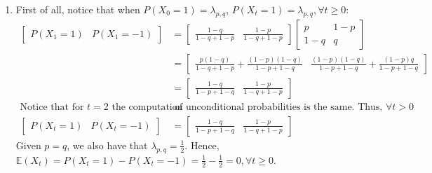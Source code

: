 \documentclass[]{article}
\begin{document}
\begin{enumerate}[label=\alph*)]
	\item First of all, notice that when $P(X_0=1)=\lambda_{p,q}$, $P(X_t=1)=\lambda_{p,q}, \forall t\geq0$:
	\begin{equation}
	\begin{split}
		\begin{bmatrix}
		P(X_1=1) & P(X_1=-1)
		\end{bmatrix}&=\begin{bmatrix}
		\frac{1-q}{1-q+1-p} & \frac{1-p}{1-q+1-p}
		\end{bmatrix}\begin{bmatrix}
		p & 1-p \\ 1-q & q
		\end{bmatrix}\\
		& = \begin{bmatrix}
		\frac{p(1-q)}{1-q+1-p}+\frac{(1-p)(1-q)}{1-p+1-q} & \frac{(1-p)(1-q)}{1-p+1-q}+\frac{(1-p)q}{1-p+1-q}
		\end{bmatrix}\\
		& = \begin{bmatrix}
		\frac{1-q}{1-p+1-q} & \frac{1-p}{1-q+1-p}
		\end{bmatrix} \\ \nonumber
		\text{Notice that for }t=2\text{ the computation}&\text{ of unconditional probabilities is the same. Thus, } \forall t>0\\
		\begin{bmatrix}
		P(X_t=1) & P(X_t=-1)
		\end{bmatrix}&=\begin{bmatrix}
		\frac{1-q}{1-p+1-q} & \frac{1-p}{1-q+1-p}
		\end{bmatrix}
		\end{split}
	\end{equation}
	Given $p=q$, we also have that $\lambda_{p,q}=\frac{1}{2}$. Hence, $\mathbb{E}(X_t)=P(X_t=1)-P(X_t=-1)=\frac{1}{2}-\frac{1}{2}=0, \forall t \geq 0$.
	

\end{enumerate}
\end{document}
